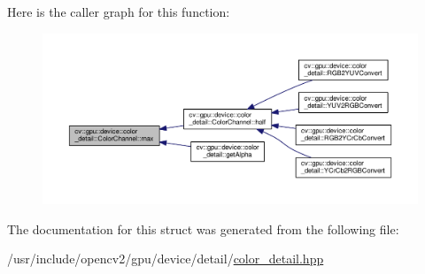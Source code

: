 Here is the caller graph for this function\-:\nopagebreak
\begin{figure}[H]
\begin{center}
\leavevmode
\includegraphics[width=350pt]{structcv_1_1gpu_1_1device_1_1color__detail_1_1ColorChannel_aedd738fa8d5f922cb3dffcb3fe005b7d_icgraph}
\end{center}
\end{figure}




The documentation for this struct was generated from the following file\-:\begin{DoxyCompactItemize}
\item 
/usr/include/opencv2/gpu/device/detail/\hyperlink{color__detail_8hpp}{color\-\_\-detail.\-hpp}\end{DoxyCompactItemize}
